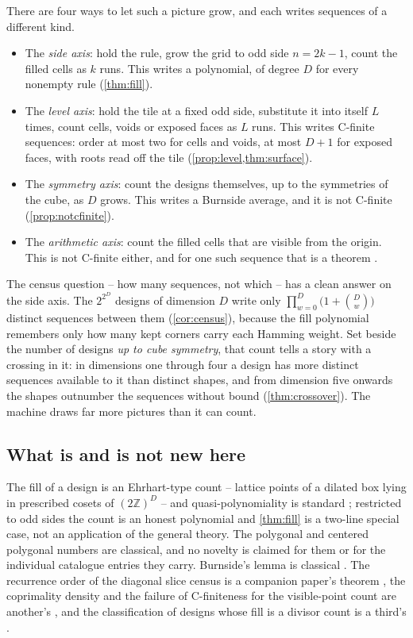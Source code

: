 \documentclass[11pt]{amsart}
\theoremstyle{definition}
\theoremstyle{remark}
\begin{document}
There are four ways to let such a picture grow, and each writes sequences of a different kind.

\begin{itemize}
\item The \emph{side axis}: hold the rule, grow the grid to odd side $n = 2k-1$, count the filled cells as $k$ runs. This writes a polynomial, of degree $D$ for every nonempty rule (\cref{thm:fill}).
\item The \emph{level axis}: hold the tile at a fixed odd side, substitute it into itself $L$ times, count cells, voids or exposed faces as $L$ runs. This writes C-finite sequences: order at most two for cells and voids, at most $D+1$ for exposed faces, with roots read off the tile (\cref{prop:level,thm:surface}).
\item The \emph{symmetry axis}: count the designs themselves, up to the symmetries of the cube, as $D$ grows. This writes a Burnside average, and it is not C-finite (\cref{prop:notcfinite}).
\item The \emph{arithmetic axis}: count the filled cells that are visible from the origin. This is not C-finite either, and for one such sequence that is a theorem \cite{coprimepaper}.
\end{itemize}

The census question -- how many sequences, not which -- has a clean answer on the side axis. The $2^{2^{D}}$ designs of dimension $D$ write only $\prod_{w=0}^{D}\bigl(1+\binom{D}{w}\bigr)$ distinct sequences between them (\cref{cor:census}), because the fill polynomial remembers only how many kept corners carry each Hamming weight. Set beside the number of designs \emph{up to cube symmetry}, that count tells a story with a crossing in it: in dimensions one through four a design has more distinct sequences available to it than distinct shapes, and from dimension five onwards the shapes outnumber the sequences without bound (\cref{thm:crossover}). The machine draws far more pictures than it can count.

\subsection*{What is and is not new here}

The fill of a design is an Ehrhart-type count -- lattice points of a dilated box lying in prescribed cosets of $(2\mathbb{Z})^{D}$ -- and quasi-polynomiality is standard \cite{beckrobins}; restricted to odd sides the count is an honest polynomial and \cref{thm:fill} is a two-line special case, not an application of the general theory. The polygonal and centered polygonal numbers are classical, and no novelty is claimed for them or for the individual catalogue entries they carry. Burnside's lemma is classical \cite{rotman}. The recurrence order of the diagonal slice census is a companion paper's theorem \cite{slicepaper}, the coprimality density and the failure of C-finiteness for the visible-point count are another's \cite{coprimepaper}, and the classification of designs whose fill is a divisor count is a third's \cite{avatarpaper}.
\end{document}
